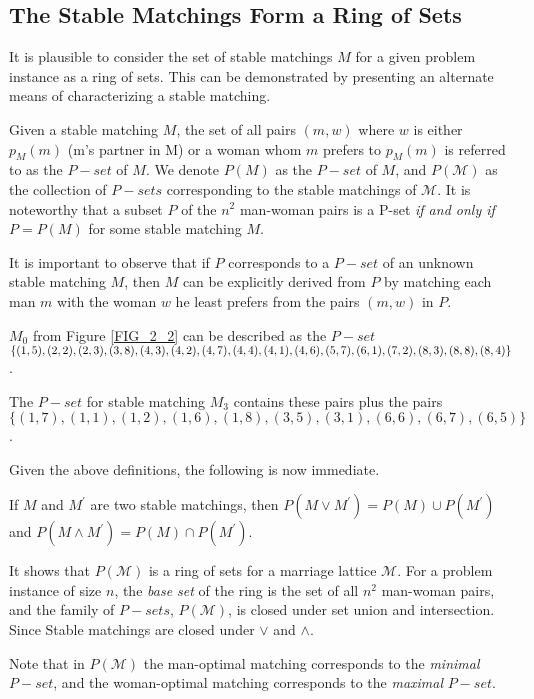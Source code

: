\subsection{ The Stable Matchings Form a Ring of Sets}

It is plausible to consider the set of stable matchings $M$ for a given problem instance as a ring of sets. This can be demonstrated by presenting an alternate means of characterizing a stable matching.

Given a stable matching $M$, the set of all pairs $(m,w)$ where $w$ is either $p_M(m)$ (m's partner in M) or a woman whom $m$ prefers to $p_M(m)$ is referred to as the $P-set$ of $M$. We denote $P(M)$ as the $P-set$ of $M$, and $P(\mathcal{M})$ as the collection of $P-sets$ corresponding to the stable matchings of $\mathcal{M}$. It is noteworthy that a subset $P$ of the $n^2$ man-woman pairs is a P-set \textit{if and only if} $P = P(M)$ for some stable matching $M$.

It is important to observe that if $P$ corresponds to a $P-set$ of an unknown stable matching $M$, then $M$ can be explicitly derived from $P$ by matching each man $m$ with the woman $w$ he least prefers from the pairs $(m, w)$ in $P$.

\begin{exmp}\label{exmp_2_3}
    $M_0$ from Figure \ref{FIG_2_2} can be described as the $P-set$ \newline $\{(1, 5),(2, 2),(2, 3),(3, 8),(4, 3),(4, 2),(4, 7),(4, 4),(4, 1),(4, 6),(5, 7), \newline (6, 1),
(7, 2),(8, 3),(8, 8),(8, 4)\}$.
\end{exmp}

\begin{exmp}\label{exmp_2_4}
The $P-set$ for stable matching $M_3$ contains these pairs plus the pairs
$\{(1, 7),(1, 1),(1, 2),(1, 6),(1, 8),(3, 5),(3, 1),(6, 6),
(6, 7),(6, 5)\}$.
\end{exmp}

Given the above definitions, the following is now immediate.

\begin{lemma}\label{lem_2_3}
If $M$ and $M^\prime$ are two stable matchings, then $P(M \vee M^\prime) = P(M) \cup P(M^\prime)$ and $P(M \wedge M^\prime) = P(M) \cap P(M^\prime)$. 
\end{lemma}

It shows that $P(\mathcal{M})$ is a ring of sets for a marriage lattice $\mathcal{M}$. For a problem instance of size $n$, the \textit{base set} of the ring is the set of all $n^2$ man-woman pairs, and the family of $P-sets$, $P(\mathcal{M})$, is closed under set union and intersection. Since Stable matchings are closed under $\vee$ and $\wedge$.

Note that in $P(\mathcal{M})$ the man-optimal matching corresponds to the \textit{minimal} $P-set$, and the woman-optimal matching corresponds to the \textit{maximal} $P-set$.


